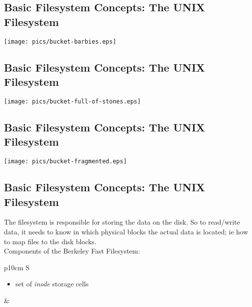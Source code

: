 \documentclass[xga]{xdvislides}
\begin{document}
\subsection{Basic Filesystem Concepts: The UNIX Filesystem}
\begin{center}
\texttt{[image: pics/bucket-barbies.eps]} \\
\end{center}

\subsection{Basic Filesystem Concepts: The UNIX Filesystem}
\vspace*{\fill}
\begin{center}
\texttt{[image: pics/bucket-full-of-stones.eps]} \\
\end{center}
\vspace*{\fill}

\subsection{Basic Filesystem Concepts: The UNIX Filesystem}
\vspace*{\fill}
\begin{center}
\texttt{[image: pics/bucket-fragmented.eps]} \\
\end{center}
\vspace*{\fill}

\subsection{Basic Filesystem Concepts: The UNIX Filesystem}
The filesystem is responsible for storing the data on the disk.
So to read/write data, it needs to know in which physical blocks the actual
data is located; ie how to map files to the disk blocks.
\\

Components of the Berkeley Fast Filesystem:
\\

\begin{tabular}{ p{10cm} S }
\begin{itemize}
	\item set of {\em inode} storage cells
\end{itemize}
&  \\
\end{tabular}
\end{document}
